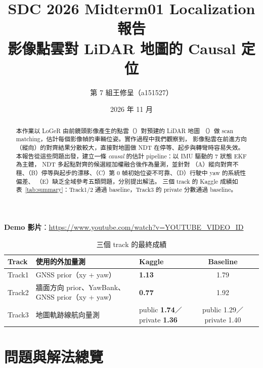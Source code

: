 \documentclass[11pt, a4paper]{article}
\title{SDC 2026 Midterm01 Localization 報告\\[2pt]
\large 影像點雲對 LiDAR 地圖的 Causal 定位}
\author{第 7 組\quad 王修呈（a151527）}
\date{2026 年 11 月}
\newcommand{\code}[1]{\texttt{\detokenize{#1}}}
\begin{document}
\maketitle

\begin{abstract}
本作業以 LoGeR 由前鏡頭影像產生的點雲（\code{raw_ply}）對預建的 LiDAR 地圖
（\code{map.pcd}）做 scan matching，估計每個影像幀的車輛位姿。實作過程中我們觀察到，
影像點雲在前進方向（縱向）的對齊結果分散較大，直接對地圖做 NDT 在停等、起步與轉彎時容易失效。
本報告從這些問題出發，建立一條 \emph{causal} 的估計 pipeline：以 IMU 驅動的 7 狀態 EKF 為主體，
NDT 多起點對齊的候選經加權融合後作為量測，並針對
（A）縱向對齊不穩、（B）停等與起步的漂移、（C）第 0 幀初始位姿不可靠、（D）行駛中 yaw 的系統性偏差、
（E）缺乏全域參考五類問題，分別提出解法。
三個 track 的 Kaggle 成績如表~\ref{tab:summary}：Track1/2 通過 baseline，Track3 的 private 分數通過 baseline。
\end{abstract}

\noindent\textbf{Demo 影片}：\href{https://www.youtube.com/watch?v=YOUTUBE_VIDEO_ID}{https://www.youtube.com/watch?v=YOUTUBE\_VIDEO\_ID}

\begin{table}[H]
\centering\small
\caption{三個 track 的最終成績}\label{tab:summary}
\begin{tabularx}{\linewidth}{@{} l X Y c c @{}}
\toprule
Track & 使用的外加量測 & Kaggle & Baseline \\
\midrule
Track1 & GNSS prior（xy + yaw） & \textbf{1.13} & 1.79 \\
\addlinespace %
Track2 & 牆面方向 prior、YawBank、GNSS prior（xy + yaw） & \textbf{0.77} & 1.92 \\
\addlinespace
Track3 & 地圖軌跡線航向量測 & public \textbf{1.74}／ private \textbf{1.36}
       & public 1.29／\newline private 1.40 \\
\bottomrule
\end{tabularx}
\end{table}


\section{問題與解法總覽}
\end{document}
